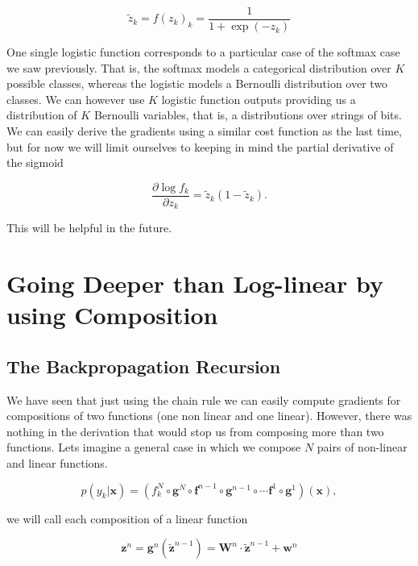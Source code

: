 \begin{equation}
\tilde{z}_k = f(z_k)_k = \frac{1}{1+\exp(-z_k)} 
\label{eq:sigmoid}
\end{equation}

One single logistic function corresponds to a particular case of the softmax case we saw previously. That is, the softmax models a categorical distribution over $K$ possible classes, whereas the logistic models a Bernoulli distribution over two classes. We can however use $K$ logistic function outputs providing us a distribution of $K$ Bernoulli variables, that is, a distributions over strings of bits. We can easily derive the gradients using a similar cost function as the last time, but for now we will limit ourselves to keeping in mind the partial derivative of the sigmoid 

\begin{equation}
\frac{\partial \log f_{k}}{\partial z_{k}} = \tilde{z}_{k} (1-\tilde{z}_{k}).
\label{eq:partsigmoid}
\end{equation}

\noindent This will be helpful in the future.

\section{Going Deeper than Log-linear by using Composition}

\subsection{The Backpropagation Recursion}

We have seen that just using the chain rule we can easily compute gradients for compositions of two functions (one non linear and one linear). However, there was nothing in the derivation that would stop us from composing more than two functions. Lets imagine a general case in which we compose $N$ pairs of non-linear and linear functions.

\begin{equation}
p(y_k|\mathbf{x}) = (f_k^N \circ \mathbf{g}^N \circ \mathbf{f}^{n-1} \circ \mathbf{g}^{n-1} \circ \cdots \mathbf{f}^1 \circ \mathbf{g}^1)(\mathbf{x}),
\end{equation}

\noindent we will call each composition of a linear function

\begin{equation}
\mathbf{z}^n = \mathbf{g}^n(\tilde{\mathbf{z}}^{n-1}) = \mathbf{W}^n \cdot \tilde{\mathbf{z}}^{n-1} + \mathbf{w}^n 
\end{equation}

